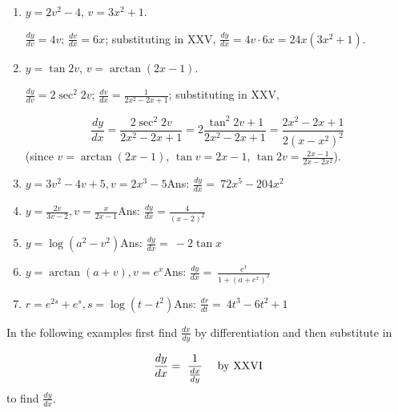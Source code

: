 \begin{enumerate}
\addtocounter{enumi}{36}
\item
$y = 2v^2 - 4$, $v = 3x^2 + 1$.

$\frac{dy}{dv} = 4v$; $\frac{dv}{dx} = 6x$; substituting in XXV,
$\frac{dy}{dx} = 4v \cdot 6x = 24x(3x^2 + 1)$.

\item
$y = \tan 2v$, $v = \arctan(2x - 1)$.

$\frac{dy}{dv} = 2 \sec^2 2v$; $\frac{dv}{dx} = \frac{1}{2x^2 - 2x + 1}$; substituting in XXV,

\[
\frac{dy}{dx} = \frac{2 \sec^2 2v}{2x^2 - 2x + 1} 
= 2 \frac{\tan^2 2v + 1}{2x^2 - 2x + 1} 
= \frac{2x^2 - 2x + 1}{2(x - x^2)^2}
\]
(since $v = \arctan (2x - 1)$, $\tan v = 2x - 1$, $\tan 2v = \frac{2x - 1}{2x - 2x^2}$).

\item
$y = 3 v^2 - 4v + 5, v = 2x^3 - 5$\qquad\qquad\qquad\qquad\qquad\qquad Ans:  
$\frac{dy}{dx} 	=\ 72x^5 - 204x^2$

\item
$y = \frac{2v}{3v - 2}, v = \frac{x}{2x - 1}$\qquad\qquad\qquad\qquad\qquad\qquad Ans:  
$\frac{dy}{dx} 	= \frac{4}{(x - 2)^2}$

\item
$y = \log(a^2 - v^2)$\qquad\qquad\qquad\qquad\qquad\qquad Ans:  
$\frac{dy}{dx} 	=\ -2 \tan x$

\item
$y = \arctan (a + v), v = e^x$\qquad\qquad\qquad\qquad\qquad\qquad Ans: 
$\frac{dy}{dx} 	=\ \frac{e^x}{1 + (a + e^x)^2}$

\item
$r = e^{2s} + e^s, s = \log(t - t^2)$\qquad\qquad\qquad\qquad\qquad\qquad Ans:  	
$\frac{dr}{dt} 	=\ 4t^3 - 6t^2 + 1$
\end{enumerate}

In the following examples first find $\frac{dx}{dy}$ by differentiation 
and then substitute in

\[
\frac{dy}{dx} 	=\ \frac{1}{\frac{dx}{dy}}\ \ \ \ {\rm	by\ XXVI}
\]
to find $\frac{dy}{dx}$.

